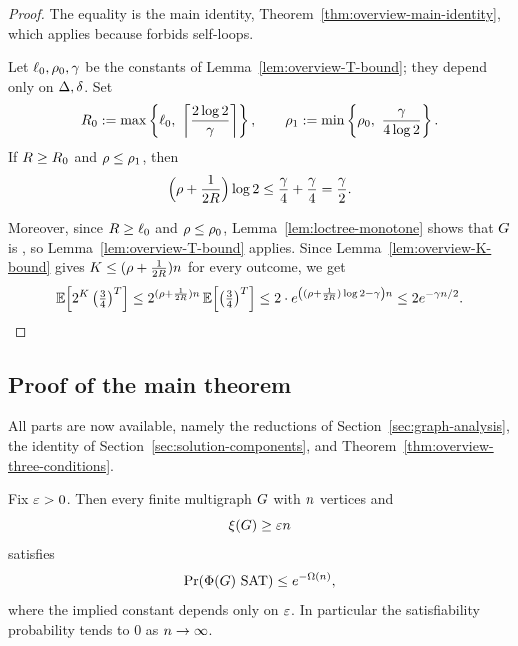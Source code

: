 \begin{proof}
The equality is the main identity, Theorem~\ref{thm:overview-main-identity},
which applies because \Hyp{} forbids self-loops.

Let \(\ell_0,\rho_0,\gamma\) be the constants of
Lemma~\ref{lem:overview-T-bound}; they depend only on \(\Delta,\delta\). Set
\[
  \radz:=\max\left\{\plenz,\ \left\lceil\frac{2\log2}{\rate}\right\rceil\right\},
  \qquad
  \nontreeo:=\min\left\{\nontreez,\ \frac{\rate}{4\log2}\right\} .
\]
If \(R\ge R_0\) and \(\rho\le\rho_1\), then
\[
  \Bigl(\rho+\frac1{2R}\Bigr)\log2
  \le\frac{\gamma}{4}+\frac{\gamma}{4}
  =\frac{\gamma}{2} .
\]

Moreover, since \(R\ge\ell_0\) and \(\rho\le\rho_0\),
Lemma~\ref{lem:loctree-monotone} shows that \(G\) is
\loctree{\plenz}{\nontreez}, so Lemma~\ref{lem:overview-T-bound} applies.
Since Lemma~\ref{lem:overview-K-bound} gives
\(K\le(\rho+\frac1{2R})n\) for every outcome, we get
\[
  \Ex{2^{\Kdef}\left(\tfrac34\right)^{\Tdef}}
  \le 2^{(\nontree+\frac1{2\rad})\nvert}\,\Ex{\left(\tfrac34\right)^{\Tdef}}
  \le 2\cdot e^{\left((\nontree+\frac1{2\rad})\log2-\rate\right)\nvert}
  \le 2e^{-\rate\nvert/2} .
\]
\end{proof}

\subsection{Proof of the main theorem}\label{subsec:main-proof}

All parts are now available, namely the reductions of
Section~\ref{sec:graph-analysis}, the identity of
Section~\ref{sec:solution-components}, and
Theorem~\ref{thm:overview-three-conditions}.

\begin{mainrestatement}
Fix \(\varepsilon>0\). Then every finite multigraph \(G\) with \(n\)
vertices and
\[
  \xi(G)\ge\varepsilon n
\]
satisfies
\[
  \Prx{\rform{\Gin}\SAT}\le e^{-\Omega(\nvert)},
\]
where the implied constant depends only on \(\varepsilon\). In particular the
satisfiability probability tends to \(0\) as \(n\to\infty\).
\end{mainrestatement}

